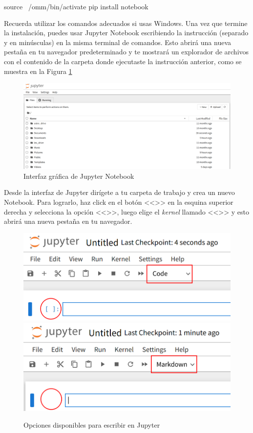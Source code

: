 \begin{terminal}
source ~/omm/bin/activate
pip install notebook
\end{terminal}

Recuerda utilizar los comandos adecuados si usas Windows. Una vez que termine la instalación, puedes usar Jupyter Notebook escribiendo la instrucción  (separado y en minúsculas) en la misma terminal de comandos. Esto abrirá una nueva pestaña en tu navegador predeterminado y te mostrará un explorador de archivos con el contenido de la carpeta donde ejecutaste la instrucción anterior, como se muestra en la Figura \ref{fig:jupyter-interface}

\begin{figure}[htb]
    \centering
    \includegraphics[width=\linewidth]{figures/jupyter-interface.png}
    \caption{Interfaz gráfica de Jupyter Notebook}
    \label{fig:jupyter-interface}
\end{figure}

Desde la interfaz de Jupyter dirígete a tu carpeta de trabajo y crea un nuevo Notebook. Para lograrlo, haz click en el botón <<>> en la esquina superior derecha y selecciona la opción <<>>, luego elige el \emph{kernel} llamado <<>> y esto abrirá una nueva pestaña en tu navegador. 

\begin{figure}[htb]
    \centering
    \includegraphics[width=0.48\linewidth]{figures/Jupyter-code.png} \hfill \includegraphics[width=0.48\linewidth]{figures/jupyter-markdown.png}
    \caption{Opciones disponibles para escribir en Jupyter}
    \label{fig:jupyter-code-markdown}
\end{figure}

